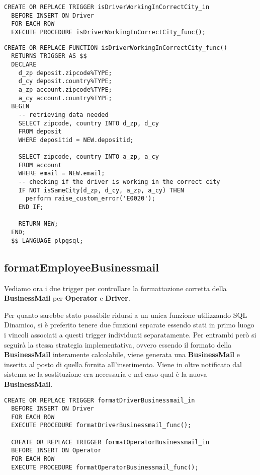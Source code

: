 \begin{lstlisting}[caption={Trigger per il vincolo \textbf{isDriverWorkingInCorrectCity}}]
  CREATE OR REPLACE TRIGGER isDriverWorkingInCorrectCity_in
  BEFORE INSERT ON Driver
  FOR EACH ROW
  EXECUTE PROCEDURE isDriverWorkingInCorrectCity_func();
\end{lstlisting}
\newpage
\begin{lstlisting}[caption={Funzione per il vincolo \textbf{isDriverWorkingInCorrectCity}}]
  CREATE OR REPLACE FUNCTION isDriverWorkingInCorrectCity_func()
  RETURNS TRIGGER AS $$
  DECLARE
    d_zp deposit.zipcode%TYPE;
    d_cy deposit.country%TYPE;
    a_zp account.zipcode%TYPE;
    a_cy account.country%TYPE;
  BEGIN
    -- retrieving data needed
    SELECT zipcode, country INTO d_zp, d_cy
    FROM deposit
    WHERE depositid = NEW.depositid;

    SELECT zipcode, country INTO a_zp, a_cy
    FROM account
    WHERE email = NEW.email;
    -- checking if the driver is working in the correct city
    IF NOT isSameCity(d_zp, d_cy, a_zp, a_cy) THEN
      perform raise_custom_error('E0020');
    END IF;
    
    RETURN NEW;
  END;
  $$ LANGUAGE plpgsql;
\end{lstlisting}

\subsection{\textbf{formatEmployeeBusinessmail}}

Vediamo ora i due trigger per controllare la formattazione corretta della \textbf{BusinessMail} per \textbf{Operator} e \textbf{Driver}.

Per quanto sarebbe stato possibile ridursi a un unica funzione utilizzando SQL Dinamico, si è preferito tenere due funzioni separate essendo stati in primo luogo i vincoli associati a questi trigger individuati separatamente.
Per entrambi però si seguirà la stessa strategia implementativa, ovvero essendo il formato della \textbf{BusinessMail} interamente calcolabile, viene generata una \textbf{BusinessMail} e inserita al posto di quella fornita all'inserimento. 
Viene in oltre notificato dal sistema se la sostituzione era necessaria e nel caso qual è la nuova \textbf{BusinessMail}.

\begin{lstlisting}[caption={Trigger per i vincoli \textbf{formatDriverBusinessmail} e \textbf{formatOperatorBusinessmail}}]
  CREATE OR REPLACE TRIGGER formatDriverBusinessmail_in
  BEFORE INSERT ON Driver
  FOR EACH ROW
  EXECUTE PROCEDURE formatDriverBusinessmail_func();

  CREATE OR REPLACE TRIGGER formatOperatorBusinessmail_in
  BEFORE INSERT ON Operator
  FOR EACH ROW
  EXECUTE PROCEDURE formatOperatorBusinessmail_func();
\end{lstlisting}

